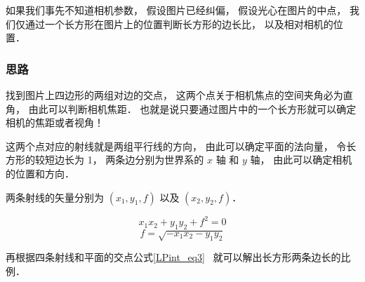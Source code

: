 

如果我们事先不知道相机参数， 假设图片已经纠偏， 假设光心在图片的中点， 我们仅通过一个长方形在图片上的位置判断长方形的边长比， 以及相对相机的位置．

\subsubsection{思路}

找到图片上四边形的两组对边的交点， 这两个点关于相机焦点的空间夹角必为直角， 由此可以判断相机焦距． 也就是说只要通过图片中的一个长方形就可以确定相机的焦距或者视角！

这两个点对应的射线就是两组平行线的方向， 由此可以确定平面的法向量， 令长方形的较短边长为 1， 两条边分别为世界系的 $x$ 轴 和 $y$ 轴， 由此可以确定相机的位置和方向．

两条射线的矢量分别为 $(x_1, y_1, f)$ 以及 $(x_2, y_2, f)$．

\begin{equation}
x_1 x_2 + y_1 y_2 + f^2 = 0
\end{equation}
\begin{equation}
f = \sqrt{-x_1 x_2 - y_1 y_2}
\end{equation}

再根据四条射线和平面的交点公式\autoref{LPint_eq3}~ 就可以解出长方形两条边长的比例．
